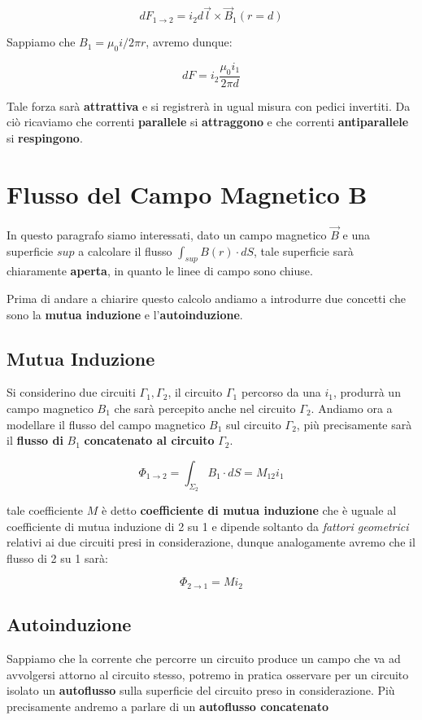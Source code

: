 $$
dF_{1\rightarrow2} = i_2 d\vec{l} \times \vec{B}_1(r=d)
$$

Sappiamo che $B_1 = \mu_0i/2\pi r $, avremo dunque: 

$$ 
dF = i_2 \frac{\mu_0 i_1}{2\pi d}
$$

Tale forza sarà \textbf{attrattiva} e si registrerà in ugual misura con pedici invertiti.  Da ciò ricaviamo che correnti \textbf{parallele} si \textbf{attraggono} e che correnti \textbf{antiparallele} si \textbf{respingono}.

\section{Flusso del Campo Magnetico B}
In questo paragrafo siamo interessati, dato un campo magnetico $\vec{B}$ e una superficie $sup$ a calcolare il flusso $\int_{sup} B(r) \cdot dS$, tale superficie sarà chiaramente \textbf{aperta}, in quanto le linee di campo sono chiuse. 

Prima di andare a chiarire questo calcolo andiamo a introdurre due concetti che sono la \textbf{mutua induzione} e l'\textbf{autoinduzione}. 

\subsection{Mutua Induzione}

Si considerino due circuiti $\Gamma_1, \Gamma_2$,  il circuito $\Gamma_1$ percorso da una $i_1$,  produrrà un campo magnetico $B_1$ che sarà percepito anche nel circuito $\Gamma_2$. Andiamo ora a modellare il flusso del campo magnetico $B_1$ sul circuito $\Gamma_2$, più precisamente sarà il \textbf{flusso di} $B_1$ \textbf{concatenato al circuito} $\Gamma_2$. 

\begin{large}
	\begin{equation}
		\Phi_{1\rightarrow2}  = \int_{\Sigma_2} B_1 \cdot dS = M_{12}i_1
	\end{equation}
\end{large}

tale coefficiente $M$ è detto \textbf{coefficiente di mutua induzione} che è uguale al coefficiente di mutua induzione di 2 su 1 e dipende soltanto da \textit{fattori geometrici} relativi ai due circuiti presi in considerazione, dunque analogamente avremo che il flusso di 2 su 1 sarà: 

$$
\Phi_{2\rightarrow1} = Mi_2
$$

\subsection{Autoinduzione}
Sappiamo che la corrente che percorre un circuito produce un campo che va ad avvolgersi attorno al circuito stesso, potremo in pratica osservare per un circuito isolato un \textbf{autoflusso} sulla superficie del circuito preso in considerazione. Più precisamente andremo a parlare di un \textbf{autoflusso concatenato}


